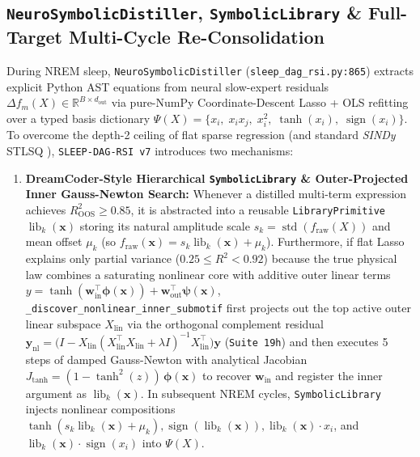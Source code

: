 \documentclass[11pt,a4paper]{article}
\begin{document}
\subsection{\texttt{NeuroSymbolicDistiller}, \texttt{SymbolicLibrary} \& Full-Target Multi-Cycle Re-Consolidation}

During NREM sleep, \texttt{NeuroSymbolicDistiller} (\texttt{sleep\_dag\_rsi.py:865}) extracts explicit Python AST equations from neural slow-expert residuals $\Delta f_m(X) \in \mathbb{R}^{B \times d_{\text{out}}}$ via pure-NumPy Coordinate-Descent Lasso + OLS refitting over a typed basis dictionary $\Psi(X) = \{x_i,\; x_i x_j,\; x_i^2,\; \tanh(x_i),\; \operatorname{sign}(x_i)\}$. To overcome the depth-2 ceiling of flat sparse regression (and standard \emph{SINDy} STLSQ \cite{brunton2016}), \texttt{SLEEP-DAG-RSI v7} introduces two mechanisms:
\begin{enumerate}
\item \textbf{DreamCoder-Style Hierarchical \texttt{SymbolicLibrary} \& Outer-Projected Inner Gauss-Newton Search:}
Whenever a distilled multi-term expression achieves $R^2_{\text{OOS}} \ge 0.85$, it is abstracted into a reusable \texttt{LibraryPrimitive} $\operatorname{lib}_k(\mathbf{x})$ storing its natural amplitude scale $s_k = \operatorname{std}(f_{\text{raw}}(X))$ and mean offset $\mu_k$ (so $f_{\text{raw}}(\mathbf{x}) = s_k \operatorname{lib}_k(\mathbf{x}) + \mu_k$). Furthermore, if flat Lasso explains only partial variance ($0.25 \le R^2 < 0.92$) because the true physical law combines a saturating nonlinear core with additive outer linear terms $y = \tanh(\mathbf{w}_{\text{in}}^\top \boldsymbol{\phi}(\mathbf{x})) + \mathbf{w}_{\text{out}}^\top \boldsymbol{\psi}(\mathbf{x})$, \texttt{\_discover\_nonlinear\_inner\_submotif} first projects out the top active outer linear subspace $X_{\text{lin}}$ via the orthogonal complement residual $\mathbf{y}_{\text{nl}} = \bigl(I - X_{\text{lin}}(X_{\text{lin}}^\top X_{\text{lin}} + \lambda I)^{-1}X_{\text{lin}}^\top\bigr)\mathbf{y}$ (\texttt{Suite 19h}) and then executes 5 steps of damped Gauss-Newton with analytical Jacobian $J_{\tanh} = (1 - \tanh^2(z))\,\boldsymbol{\phi}(\mathbf{x})$ to recover $\mathbf{w}_{\text{in}}$ and register the inner argument as $\operatorname{lib}_k(\mathbf{x})$. In subsequent NREM cycles, \texttt{SymbolicLibrary} injects nonlinear compositions $\tanh(s_k \operatorname{lib}_k(\mathbf{x}) + \mu_k), \operatorname{sign}(\operatorname{lib}_k(\mathbf{x})), \operatorname{lib}_k(\mathbf{x}) \cdot x_i$, and $\operatorname{lib}_k(\mathbf{x}) \cdot \operatorname{sign}(x_i)$ into $\Psi(X)$.

\end{enumerate}
\end{document}
